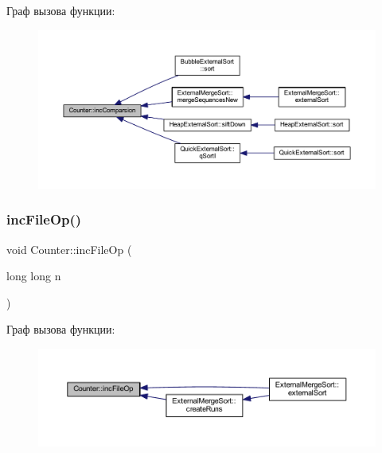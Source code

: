 Граф вызова функции\+:\nopagebreak
\begin{figure}[H]
\begin{center}
\leavevmode
\includegraphics[width=350pt]{class_counter_a224d93150c0fe2982d3efd7aa99668e6_icgraph}
\end{center}
\end{figure}
\hypertarget{class_counter_a63310182709c321ad8fe8e78b81d12aa}{}\label{class_counter_a63310182709c321ad8fe8e78b81d12aa} 
\subsubsection{\texorpdfstring{inc\+File\+Op()}{incFileOp()}}
{\footnotesize\ttfamily void Counter\+::inc\+File\+Op (\begin{DoxyParamCaption}\item[{long long}]{n }\end{DoxyParamCaption})}

Граф вызова функции\+:\nopagebreak
\begin{figure}[H]
\begin{center}
\leavevmode
\includegraphics[width=350pt]{class_counter_a63310182709c321ad8fe8e78b81d12aa_icgraph}
\end{center}
\end{figure}
\hypertarget{class_counter_aa0cd30379394257e44aa7afc84ed1fce}{}\label{class_counter_aa0cd30379394257e44aa7afc84ed1fce} 
